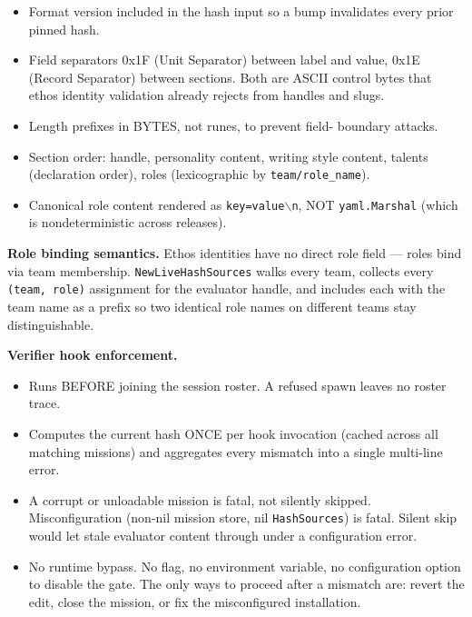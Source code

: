 \documentclass[a4paper,10pt]{article}
\begin{document}
\begin{itemize}
  \item Format version included in the hash input so a bump
    invalidates every prior pinned hash.
  \item Field separators 0x1F (Unit Separator) between label and
    value, 0x1E (Record Separator) between sections.  Both are ASCII
    control bytes that ethos identity validation already rejects from
    handles and slugs.
  \item Length prefixes in BYTES, not runes, to prevent field-
    boundary attacks.
  \item Section order: handle, personality content, writing style
    content, talents (declaration order), roles (lexicographic by
    \texttt{team/role\_name}).
  \item Canonical role content rendered as \texttt{key=value$\backslash$n},
    NOT \texttt{yaml.Marshal} (which is nondeterministic across
    releases).
\end{itemize}

\textbf{Role binding semantics.}  Ethos identities have no direct
role field --- roles bind via team membership.
\texttt{NewLiveHashSources} walks every team, collects every
\texttt{(team, role)} assignment for the evaluator handle, and
includes each with the team name as a prefix so two identical role
names on different teams stay distinguishable.

\textbf{Verifier hook enforcement.}

\begin{itemize}
  \item Runs BEFORE joining the session roster.  A refused spawn
    leaves no roster trace.
  \item Computes the current hash ONCE per hook invocation (cached
    across all matching missions) and aggregates every mismatch into
    a single multi-line error.
  \item A corrupt or unloadable mission is fatal, not silently
    skipped.  Misconfiguration (non-nil mission store, nil
    \texttt{HashSources}) is fatal.  Silent skip would let stale
    evaluator content through under a configuration error.
  \item No runtime bypass.  No flag, no environment variable, no
    configuration option to disable the gate.  The only ways to
    proceed after a mismatch are: revert the edit, close the
    mission, or fix the misconfigured installation.
\end{itemize}
\end{document}
